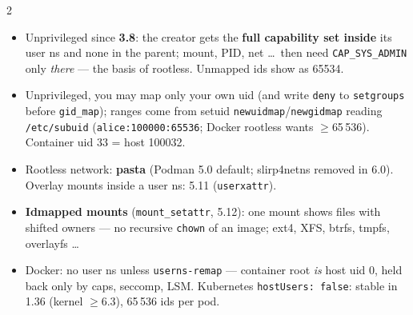 \documentclass[8pt]{extarticle}
\newcommand\ct[1]{\texttt{#1}}
\newcommand\hd[1]{\par\vspace{2pt}\noindent{\small\bfseries\color{sheetBlue}#1}\par\vspace{1pt}}
\begin{document}
\begin{multicols}{2}
\hd{User namespaces and rootless}
\noindent{}
\begin{itemize}
  \item Unprivileged since \textbf{3.8}: the creator gets the \textbf{full capability set inside}
        its user ns and none in the parent; mount, PID, net \dots\ then need \ct{CAP\_SYS\_ADMIN}
        only \emph{there} — the basis of rootless. Unmapped ids show as 65534.
  \item Unprivileged, you may map only your own uid (and write \ct{deny} to \ct{setgroups} before
        \ct{gid\_map}); ranges come from setuid \ct{newuidmap}/\ct{newgidmap} reading
        \ct{/etc/subuid} (\ct{alice:100000:65536}; Docker rootless wants $\ge$65\,536). Container uid
        33 = host 100032.
  \item Rootless network: \textbf{pasta} (Podman 5.0 default; slirp4netns removed in 6.0).
        Overlay mounts inside a user ns: 5.11 (\ct{userxattr}).
  \item \textbf{Idmapped mounts} (\ct{mount\_setattr}, 5.12): one mount shows files with shifted
        owners — no recursive \ct{chown} of an image; ext4, XFS, btrfs, tmpfs, overlayfs \dots
  \item Docker: no user ns unless \ct{userns-remap} — container root \emph{is} host uid 0, held
        back only by caps, seccomp, LSM. Kubernetes \ct{hostUsers: false}: stable in 1.36 (kernel
        $\ge$6.3), 65\,536 ids per pod.
\end{itemize}


\end{multicols}
\end{document}

